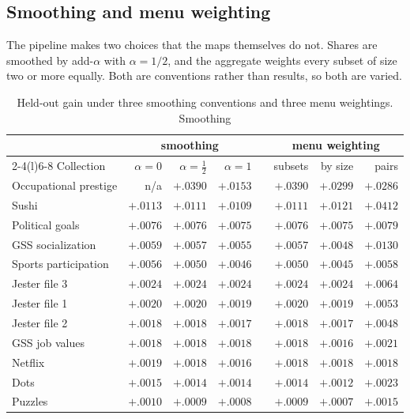 \documentclass[11pt]{article}
\theoremstyle{italichead}
\begin{document}
\subsection{Smoothing and menu weighting}
\label{sec:conventions}

The pipeline makes two choices that the maps themselves do not. Shares are smoothed by
add-$\alpha$ with $\alpha = 1/2$, and the aggregate weights every subset of size two or more
equally. Both are conventions rather than results, so both are varied.

\begin{table}[htbp]
\centering
\small
\begin{tabular}{lrrrcrrr}
\toprule
& \multicolumn{3}{c}{smoothing} & & \multicolumn{3}{c}{menu weighting} \\
\cmidrule(r){2-4}\cmidrule(l){6-8}
Collection & $\alpha=0$ & $\alpha=\tfrac12$ & $\alpha=1$ & & subsets & by size & pairs \\
\midrule
Occupational prestige & n/a & $+.0390$ & $+.0153$ & & $+.0390$ & $+.0299$ & $+.0286$ \\
Sushi & $+.0113$ & $+.0111$ & $+.0109$ & & $+.0111$ & $+.0121$ & $+.0412$ \\
Political goals & $+.0076$ & $+.0076$ & $+.0075$ & & $+.0076$ & $+.0075$ & $+.0079$ \\
GSS socialization & $+.0059$ & $+.0057$ & $+.0055$ & & $+.0057$ & $+.0048$ & $+.0130$ \\
Sports participation & $+.0056$ & $+.0050$ & $+.0046$ & & $+.0050$ & $+.0045$ & $+.0058$ \\
Jester file 3 & $+.0024$ & $+.0024$ & $+.0024$ & & $+.0024$ & $+.0024$ & $+.0064$ \\
Jester file 1 & $+.0020$ & $+.0020$ & $+.0019$ & & $+.0020$ & $+.0019$ & $+.0053$ \\
Jester file 2 & $+.0018$ & $+.0018$ & $+.0017$ & & $+.0018$ & $+.0017$ & $+.0048$ \\
GSS job values & $+.0018$ & $+.0018$ & $+.0018$ & & $+.0018$ & $+.0016$ & $+.0021$ \\
Netflix & $+.0019$ & $+.0018$ & $+.0016$ & & $+.0018$ & $+.0018$ & $+.0018$ \\
Dots & $+.0015$ & $+.0014$ & $+.0014$ & & $+.0014$ & $+.0012$ & $+.0023$ \\
Puzzles & $+.0010$ & $+.0009$ & $+.0008$ & & $+.0009$ & $+.0007$ & $+.0015$ \\
\bottomrule
\end{tabular}
\caption{Held-out gain under three smoothing conventions and three menu weightings. Smoothing
}
\end{table}
\end{document}
